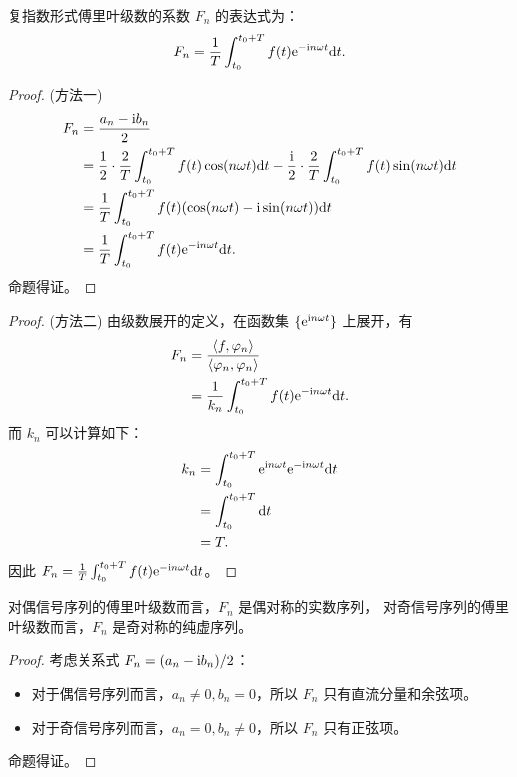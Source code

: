 \begin{property}
    复指数形式傅里叶级数的系数 $F_n$ 的表达式为：
    \begin{align*}
        F_n = \frac{1}{T}\int_{t_0}^{t_0 + T}f(t)\mathrm{e}^{-\mathrm{i} n\omega t}\mathrm{d}t.
    \end{align*}
\end{property}

\begin{proof}
    (方法一)
    \begin{align*}
        F_n & = \frac{a_n - \mathrm{i} b_n}{2} \\
        & = \frac{1}{2} \cdot \frac{2}{T}\int_{t_0}^{t_0 + T}f(t)\cos(n\omega t)\mathrm{d}t - \frac{\mathrm{i}}{2} \cdot \frac{2}{T}\int_{t_0}^{t_0 + T}f(t)\sin(n\omega t)\mathrm{d}t \\
        & = \frac{1}{T}\int_{t_0}^{t_0 + T}f(t)(\cos(n\omega t) - \mathrm{i} \sin(n\omega t))\mathrm{d}t \\
        & = \frac{1}{T}\int_{t_0}^{t_0 + T}f(t)\mathrm{e}^{-\mathrm{i} n\omega t}\mathrm{d}t.
    \end{align*}
    命题得证。
\end{proof}

\begin{proof}
    (方法二)
    由级数展开的定义，在函数集 $\{\mathrm{e}^{\mathrm{i} n\omega t}\}$ 上展开，有
    \begin{align*}
        F_n & = \frac{\left\langle f, \varphi_n\right\rangle}{\left\langle\varphi_n, \varphi_n\right\rangle}\\
        & = \frac{1}{k_n}\int_{t_0}^{t_0 + T}f(t) \mathrm{e}^{-\mathrm{i} n\omega t}\mathrm{d}t.
    \end{align*}
    而 $k_n$ 可以计算如下：
    \begin{align*}
        k_n & = \int_{t_0}^{t_0 + T}\mathrm{e}^{\mathrm{i} n\omega t}\mathrm{e}^{-\mathrm{i} n\omega t}\mathrm{d}t \\
        & = \int_{t_0}^{t_0 + T}\mathrm{d}t \\
        & = T.
    \end{align*}
    因此 $F_n = \frac{1}{T}\int_{t_0}^{t_0 + T}f(t)\mathrm{e}^{-\mathrm{i} n\omega t}\mathrm{d}t$。
\end{proof}

\begin{property}
    对偶信号序列的傅里叶级数而言，$F_n$ 是偶对称的实数序列，
    对奇信号序列的傅里叶级数而言，$F_n$ 是奇对称的纯虚序列。
\end{property}

\begin{proof}
    考虑关系式 $F_n = (a_n - \mathrm{i} b_n) / 2$：
    \begin{itemize}
        \item 对于偶信号序列而言，$a_n \neq 0, b_n = 0$，所以 $F_n$ 只有直流分量和余弦项。
        \item 对于奇信号序列而言，$a_n = 0, b_n \neq 0$，所以 $F_n$ 只有正弦项。
    \end{itemize}
    命题得证。
\end{proof}

